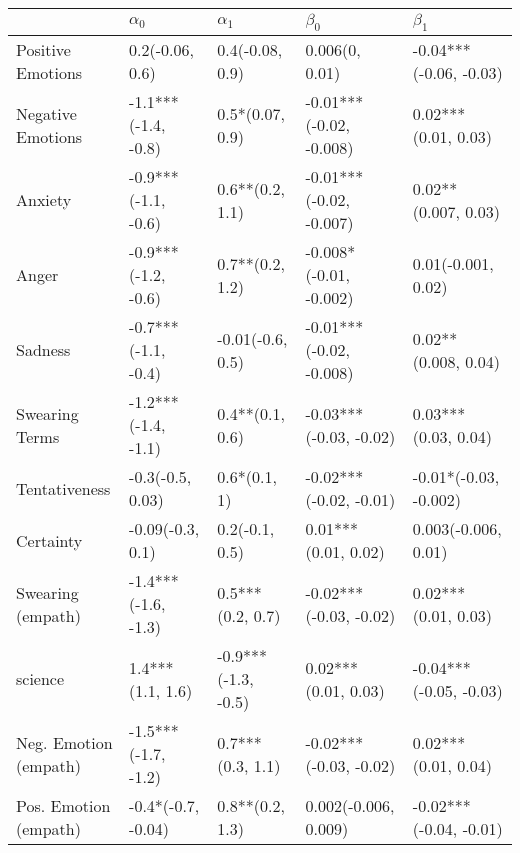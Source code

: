 \begin{tabular}{lllll}
\toprule
{} &           $\alpha_0$ &           $\alpha_1$ &                $\beta_0$ &               $\beta_1$ \\
\midrule
Positive Emotions     &      0.2(-0.06, 0.6) &      0.4(-0.08, 0.9) &           0.006(0, 0.01) &  -0.04***(-0.06, -0.03) \\
Negative Emotions     &  -1.1***(-1.4, -0.8) &      0.5*(0.07, 0.9) &  -0.01***(-0.02, -0.008) &     0.02***(0.01, 0.03) \\
Anxiety               &  -0.9***(-1.1, -0.6) &      0.6**(0.2, 1.1) &  -0.01***(-0.02, -0.007) &     0.02**(0.007, 0.03) \\
Anger                 &  -0.9***(-1.2, -0.6) &      0.7**(0.2, 1.2) &   -0.008*(-0.01, -0.002) &      0.01(-0.001, 0.02) \\
Sadness               &  -0.7***(-1.1, -0.4) &     -0.01(-0.6, 0.5) &  -0.01***(-0.02, -0.008) &     0.02**(0.008, 0.04) \\
Swearing Terms        &  -1.2***(-1.4, -1.1) &      0.4**(0.1, 0.6) &   -0.03***(-0.03, -0.02) &     0.03***(0.03, 0.04) \\
Tentativeness         &     -0.3(-0.5, 0.03) &         0.6*(0.1, 1) &   -0.02***(-0.02, -0.01) &   -0.01*(-0.03, -0.002) \\
Certainty             &     -0.09(-0.3, 0.1) &       0.2(-0.1, 0.5) &      0.01***(0.01, 0.02) &     0.003(-0.006, 0.01) \\
Swearing (empath)     &  -1.4***(-1.6, -1.3) &     0.5***(0.2, 0.7) &   -0.02***(-0.03, -0.02) &     0.02***(0.01, 0.03) \\
science               &     1.4***(1.1, 1.6) &  -0.9***(-1.3, -0.5) &      0.02***(0.01, 0.03) &  -0.04***(-0.05, -0.03) \\
Neg. Emotion (empath) &  -1.5***(-1.7, -1.2) &     0.7***(0.3, 1.1) &   -0.02***(-0.03, -0.02) &     0.02***(0.01, 0.04) \\
Pos. Emotion (empath) &   -0.4*(-0.7, -0.04) &      0.8**(0.2, 1.3) &     0.002(-0.006, 0.009) &  -0.02***(-0.04, -0.01) \\
\bottomrule
\end{tabular}
